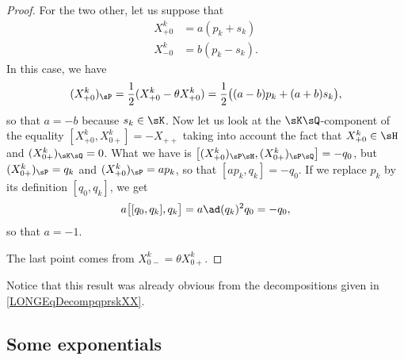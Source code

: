 \begin{proof}
	For the two other, let us suppose that
	\begin{subequations}
		\begin{align}
			X_{+0}^k&=a(p_k+s_k)\\
			X_{-0}^k&=b(p_k-s_k).
		\end{align}
	\end{subequations}
	In this case, we have 
	\begin{equation}
			(X_{+0}^k)_{\sP}=\frac{ 1 }{2}(X_{+0}^k-\theta X_{+0}^k)
				=\frac{ 1 }{2}\big( (a-b)p_k+(a+b)s_k \big),
	\end{equation}
	so that $a=-b$ because $s_k\in \sK$. Now let us look at the $\sK\sQ$-component of the equality $[X_{+0}^k,X_{0+}^k]=-X_{++}$ taking into account the fact that $X_{+0}^k\in\sH$ and $(X_{0+}^k)_{\sK\sQ}=0$. What we have is $\big[ (X_{+0}^k)_{\sP\sH},(X_{0+}^k)_{\sP\sQ} \big]=-q_0$, but $(X_{0+}^k)_{\sP}=q_k$ and $(X_{+0}^k)_{\sP}=ap_k$, so that $[ap_k,q_k]=-q_0$. If we replace $p_k$ by its definition $[q_0,q_k]$, we get
	\begin{equation}
		a\big[ [q_0,q_k],q_k \big]=a\ad(q_k)^2q_0=-q_0,
	\end{equation}
	so that $a=-1$. 

	The last point comes from $X_{0-}^k=\theta X_{0+}^k$.

\end{proof}
Notice that this result was already obvious from the decompositions given in \eqref{LONGEqDecompqprskXX}.


%
\subsection{Some exponentials}
%
\label{LONGSubSecSomeExpo}

